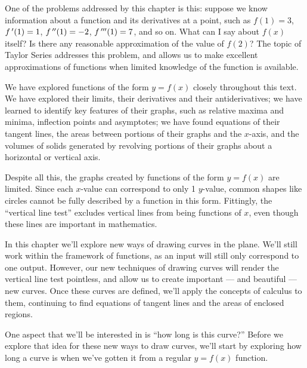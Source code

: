 One of the problems addressed by this chapter is this: suppose we know information about a function and its derivatives at a point, such as  $f(1) = 3$, $f\,'(1) = 1$, $f\,''(1) = -2$, $f\,'''(1) = 7$, and so on. What can I say about $f(x)$ itself? Is there any reasonable approximation of the value of $f(2)$? The topic of Taylor Series addresses this problem, and allows us to make excellent approximations of functions when limited knowledge of the function is available.









%





We have explored functions of the form $y=f(x)$ closely throughout this text. We have explored their limits, their derivatives and their antiderivatives; we have learned to identify key features of their graphs, such as relative maxima and minima, inflection points and asymptotes; we have found equations of their tangent lines, the areas between portions of their graphs and the $x$-axis, and the volumes of solids generated by revolving portions of their graphs about a horizontal or vertical axis.

Despite all this, the graphs created by functions of the form $y=f(x)$ are limited. Since each $x$-value can correspond to only 1 $y$-value, common shapes like circles cannot be fully described by a function in this form.  Fittingly, the ``vertical line test''  excludes vertical lines from being functions of $x$, even though these lines are important in mathematics.

In this chapter we'll explore new ways of drawing curves in the plane. We'll still work within the framework of functions, as an input will still only correspond to one output. However, our new techniques of drawing curves will render the vertical line test pointless, and allow us to create important --- and beautiful --- new curves. Once these curves are defined, we'll apply the concepts of calculus to them, continuing to find equations of tangent lines and the areas of enclosed regions.

One aspect that we'll be interested in is ``how long is this curve?'' Before we explore that idea for these new ways to draw curves, we'll start by exploring how long a curve is when we've gotten it from a regular $y=f(x)$ function.








\cleardoublepage

